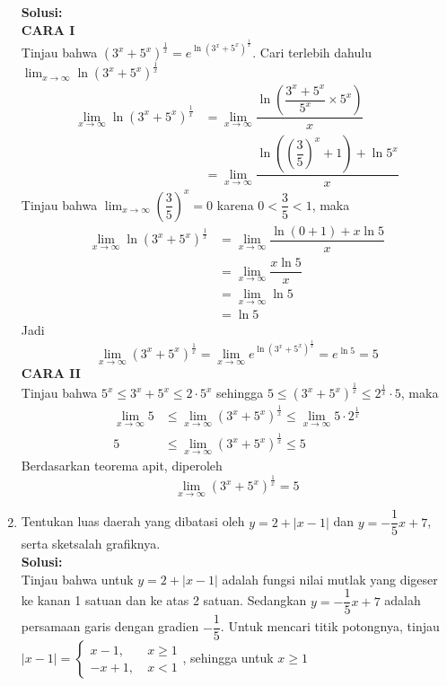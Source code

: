 \documentclass{article}
\begin{document}
\begin{enumerate}
	\textbf{Solusi:}\\
	\textbf{CARA I}\\
	Tinjau bahwa $(3^x+5^x)^{\frac{1}{x}}=e^{\ln(3^x+5^x)^{\frac{1}{x}}}$. Cari terlebih dahulu $\displaystyle \lim_{x\rightarrow \infty} \ln(3^x+5^x)^\frac{1}{x}$
	\begin{align*}
	\lim_{x\rightarrow \infty} \ln(3^x+5^x)^\frac{1}{x} &= \lim_{x\rightarrow \infty} \dfrac{\ln\left(\dfrac{3^x+5^x}{5^x}\times 5^x\right)}{x}\\
	&= \lim_{x\rightarrow \infty} \dfrac{\ln\left(\left(\dfrac{3}{5}\right)^x+1\right)+\ln 5^x}{x}
	\end{align*}
	Tinjau bahwa $\lim_{x\rightarrow \infty} \left(\dfrac{3}{5}\right)^x=0$ karena $0<\dfrac{3}{5}<1$, maka
	\begin{align*}
	\lim_{x\rightarrow \infty} \ln(3^x+5^x)^\frac{1}{x} &= \lim_{x\rightarrow \infty} \dfrac{\ln(0+1)+x\ln 5}{x} \\
	&= \lim_{x\rightarrow \infty} \dfrac{x\ln 5}{x}\\
	&= \lim_{x\rightarrow \infty} \ln 5\\
	&= \ln 5
	\end{align*}
	Jadi 
	$$ \lim_{x\rightarrow \infty} (3^x+5^x)^{\frac{1}{x}} = \lim_{x\rightarrow \infty} e^{\ln(3^x+5^x)^\frac{1}{x}} = e^{\ln 5} = 5$$
	\textbf{CARA II}\\
	Tinjau bahwa $5^x\leq3^x+5^x\leq 2\cdot 5^x$ sehingga $5\leq(3^x+5^x)^{\frac{1}{x}}\leq 2^{\frac{1}{x}}\cdot 5$, maka
	\begin{align*}
	\lim_{x\rightarrow \infty} 5&\leq\lim_{x\rightarrow \infty} (3^x+5^x)^{\frac{1}{x}}\leq\lim_{x\rightarrow \infty} 5\cdot 2^{\frac{1}{x}}\\
	5&\leq\lim_{x\rightarrow \infty} (3^x+5^x)^{\frac{1}{x}}\leq 5
	\end{align*}
	Berdasarkan teorema apit, diperoleh
	$$\lim_{x\rightarrow \infty} (3^x+5^x)^{\frac{1}{x}} = 5 $$
	\item Tentukan luas daerah yang dibatasi oleh $y=2+|x-1|$ dan $y=-\dfrac{1}{5}x+7$, serta sketsalah grafiknya.\\
	\textbf{Solusi:}\\
	Tinjau bahwa untuk $y=2+|x-1|$ adalah fungsi nilai mutlak yang digeser ke kanan 1 satuan dan ke atas 2 satuan. Sedangkan $y=-\dfrac{1}{5}x+7$ adalah persamaan garis dengan gradien $-\dfrac{1}{5}$. Untuk mencari titik potongnya, tinjau $|x-1|=\begin{cases}x-1, ~ &x\geq 1\\
		-x+1, ~&x<1\end{cases}$, sehingga untuk $x\geq 1$

\end{enumerate}
\end{document}

